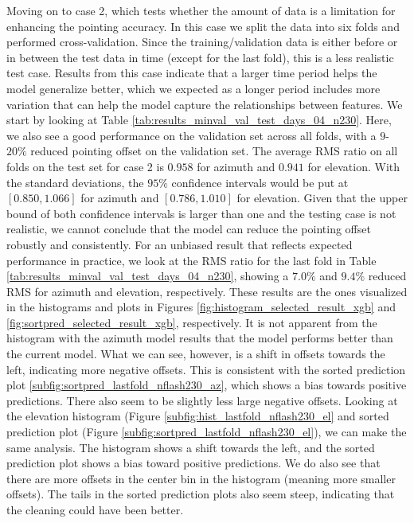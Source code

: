 Moving on to case 2, which tests whether the amount of data is a limitation for enhancing the pointing accuracy.
In this case we split the data into six folds and performed cross-validation.
Since the training/validation data is either before or in between the test data in time (except for the last fold), this is a less realistic test case.
Results from this case indicate that a larger time period helps the model generalize better, which we expected as a longer period includes more variation that can help the model capture the relationships between features.
We start by looking at Table \ref{tab:results_minval_val_test_days_04_n230}.
Here, we also see a good performance on the validation set across all folds, with a $9$-$20\%$ reduced pointing offset on the validation set.
The average RMS ratio on all folds on the test set for case 2 is $0.958$ for azimuth and $0.941$ for elevation.
With the standard deviations, the $95\%$ confidence intervals would be put at $[0.850, 1.066]$ for azimuth and $[0.786, 1.010]$ for elevation.
Given that the upper bound of both confidence intervals is larger than one and the testing case is not realistic, we cannot conclude that the model can reduce the pointing offset robustly and consistently.
For an unbiased result that reflects expected performance in practice, we look at the RMS ratio for the last fold in Table \ref{tab:results_minval_val_test_days_04_n230},
showing a $7.0\%$ and $9.4\%$ reduced RMS for azimuth and elevation, respectively.
These results are the ones visualized in the histograms and plots in Figures \ref{fig:histogram_selected_result_xgb} and \ref{fig:sortpred_selected_result_xgb}, respectively.
It is not apparent from the histogram with the azimuth model results that the model performs better than the current model.
What we can see, however, is a shift in offsets towards the left, indicating more negative offsets.
This is consistent with the sorted prediction plot \ref{subfig:sortpred_lastfold_nflash230_az}, which shows a bias towards positive predictions.
There also seem to be slightly less large negative offsets.
Looking at the elevation histogram (Figure \ref{subfig:hist_lastfold_nflash230_el} and sorted prediction plot (Figure \ref{subfig:sortpred_lastfold_nflash230_el}), we can make the same analysis.
The histogram shows a shift towards the left, and the sorted prediction plot shows a bias toward positive predictions.
We do also see that there are more offsets in the center bin in the histogram (meaning more smaller offsets).
The tails in the sorted prediction plots also seem steep, indicating that the cleaning could have been better.\\


